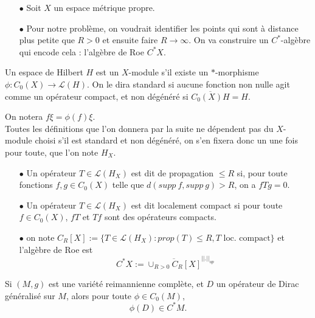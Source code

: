 \documentclass{beamer}
\begin{document}
\begin{frame}
\begin{itemize}
\item[$\bullet$] Soit $X$ un espace métrique propre. %
\item[$\bullet$] Pour notre problème, on voudrait identifier les points qui sont à distance plus petite que $R>0$ et ensuite faire $R\rightarrow \infty$. On va construire un $C^*$-algèbre qui encode cela : l'algèbre de Roe $C^* X$.\\
\end{itemize}

\begin{definition}
Un espace de Hilbert $H$ est un $X$-module s'il existe un $*$-morphisme $\phi : C_0(X)\rightarrow \mathcal L(H)$. On le dira standard si aucune fonction non nulle agit comme un opérateur compact, et non dégénéré si $\overline{C_0(X)H}=H$.
\end{definition}
On notera $f\xi= \phi(f)\xi$.\\
Toutes les définitions que l'on donnera par la suite ne dépendent pas du $X$-module choisi s'il est standard et non dégénéré, on s'en fixera donc un une fois pour toute, que l'on note $H_X$.
\end{frame}

\begin{frame}
\begin{definition}%
\begin{itemize}
\item[$\bullet$]Un opérateur $T\in \mathcal L(H_X)$ est dit de propagation $\leq R$ si, pour toute fonctions $f,g\in C_0(X)$ telle que $d(supp\ f, supp\ g) >R$, on a $fTg=0$.
\item[$\bullet$] Un opérateur $T\in \mathcal L(H_X)$ est dit localement compact si pour toute $f\in C_0(X)$, $fT$ et $Tf$ sont des opérateurs compacts.
\item[$\bullet$] on note $C_R[X]:=\{T\in \mathcal L(H_X) : prop(T)\leq R, T \text{ loc. compact}\}$ et l'algèbre de Roe est  \[C^*X:=\overline{\cup_{R>0} C_R[X]}^{||.||_{op}}\]
\end{itemize}
\end{definition}
Si $(M,g)$ est une variété reimannienne complète, et $D$ un opérateur de Dirac généralisé sur $M$, alors pour toute $\phi\in C_0(M)$,
\[\phi(D)\in C^*M.\]
\end{frame}
\end{document}
